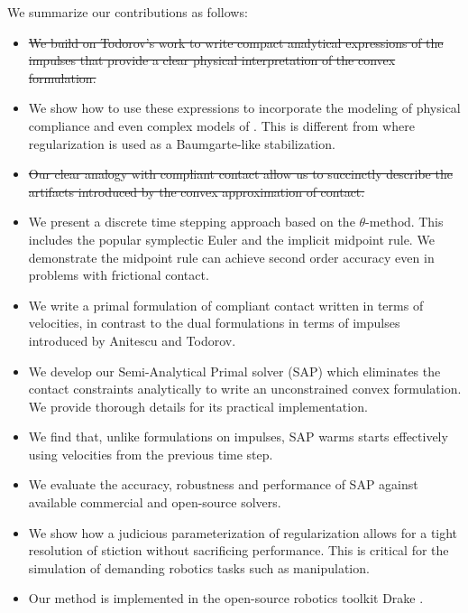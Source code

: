 We summarize our contributions as follows:
\begin{itemize}
	\item \sout{We build on Todorov's work \cite{bib:todorov2014} to write compact
	analytical expressions of the impulses that provide a clear physical
	interpretation of the convex formulation.}
	\item We show how to use these expressions to incorporate the modeling of
	physical compliance and even complex models of . This is different from
	\cite{bib:todorov2014} where regularization is used as a Baumgarte-like
	stabilization.
	\item \sout{Our clear analogy with compliant contact allow us to succinctly
	describe the artifacts introduced by the convex approximation of contact.}
	\item We present a discrete time stepping approach based on the
	$\theta\text{-method}$. This includes the popular symplectic Euler and the
	implicit midpoint rule. We demonstrate the midpoint rule can achieve second
	order accuracy even in problems with frictional contact.
	\item We write a primal formulation of compliant contact written in terms of
	velocities, in contrast to the dual formulations in terms of impulses
	introduced by Anitescu and Todorov.
	\item We develop our Semi-Analytical Primal solver (SAP) which eliminates
the contact constraints analytically to write an unconstrained convex
formulation. We provide thorough details for its practical implementation.
	\item We find that, unlike formulations on impulses, SAP warms starts effectively using velocities from the previous time step. 
	\item We evaluate the accuracy, robustness and performance of SAP against available commercial and open-source solvers.
	\item We show how a judicious parameterization of regularization allows for a tight resolution of stiction without sacrificing performance. This is critical for the simulation of demanding robotics tasks such as manipulation.
	\item Our method is implemented in the open-source robotics toolkit Drake \cite{bib:drake}.
\end{itemize}


